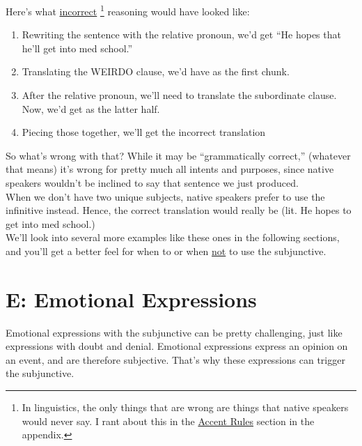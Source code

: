 Here's what \underline{incorrect} \footnote{In linguistics, the only things that are wrong are things that native speakers would never say. I rant about this in the \hyperref[subsec:accents]{Accent Rules} section in the appendix.} reasoning would have looked like: 
\begin{enumerate}
	\item Rewriting the sentence with the relative pronoun, we'd get ``He hopes that he'll get into med school.''
	\item Translating the WEIRDO clause, we'd have  as the first chunk.
	\item After the relative pronoun, we'll need to translate the subordinate clause. Now, we'd get  as the latter half.
	\item Piecing those together, we'll get the incorrect translation 
\end{enumerate}

So what's wrong with that? While it may be ``grammatically correct,'' (whatever that means) it's wrong for pretty much all intents and purposes, since native speakers wouldn't be inclined to say that sentence we just produced. \\

When we don't have two unique subjects, native speakers prefer to use the infinitive instead. Hence, the correct translation would really be  (lit. He hopes to get into med school.)\\

We'll look into several more examples like these ones in the following sections, and you'll get a better feel for when to or when \underline{not} to use the subjunctive.
\section{E: Emotional Expressions}
Emotional expressions with the subjunctive can be pretty challenging, just like expressions with doubt and denial. Emotional expressions express an opinion on an event, and are therefore subjective. That's why these expressions can trigger the subjunctive. \\

